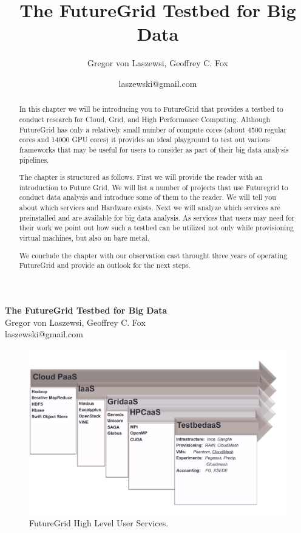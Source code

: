 \documentclass{article}
\makeatletter
\newcommand{\TITLE}{The FutureGrid Testbed for Big Data}
\newcommand{\AUTHOR}{Gregor von Laszewsi, Geoffrey C. Fox}
\newcommand{\EMAIL}{laszewski@gmail.com}
\makeatother
\begin{document}
\title{\TITLE}
\author{\AUTHOR}
\date{\EMAIL}


\begin{center}
{\Large\bf \TITLE}\\
{\AUTHOR}\\
{\EMAIL}
\end{center}

\tableofcontents

\newpage

\maketitle



\begin{abstract}

In this chapter we will be introducing you to FutureGrid that provides a testbed to conduct research for Cloud, Grid, and High Performance Computing. Although FutureGrid has only a relatively small number of compute cores (about 4500 regular cores and 14000 GPU cores) it provides an ideal playground to test out various frameworks that may be useful for users to consider as part of their big data analysis pipelines. 

The chapter is structured as follows. First we will provide the reader with an introduction to Future Grid. We will list a number of projects that use Futuregrid to conduct data analysis and introduce some of them to the reader. We will tell you about which services and Hardware exists. Next we will analyze which services are preinstalled and are available for big data analysis. As services that users may need for their work we point out how such a testbed can be utilized not only while provisioning virtual machines, but also on bare metal. 

We conclude the chapter with our observation cast throught three years of operating FutureGrid and provide an outlook for the next steps.
\end{abstract}

\begin{figure}[h!]
  \centering
    \includegraphics[width=1.0\textwidth]{images/user-services.pdf}
  \caption{FutureGrid High Level User Services.}
\end{figure}
\end{document}
